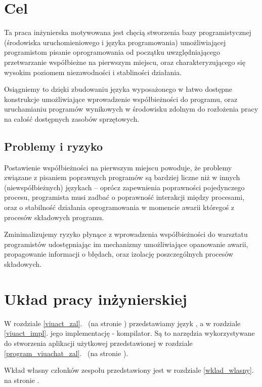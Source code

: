 \section{Cel}

Ta praca inżynierska motywowana jest chęcią stworzenia bazy programistycznej
(środowiska uruchomieniowego i języka programowania) umożliwiającej programistom
pisanie oprogramowania od początku uwzględniającego przetwarzanie współbieżne na
pierwszym miejscu, oraz charakteryzującego się wysokim poziomem niezawodności i
stabliności działania.

Osiągniemy to dzięki zbudowaniu języka wyposażonego w łatwo dostępne konstrukcje
umożliwiające wprowadzenie współbieżności do programu, oraz uruchamianiu
programów wynikowych w środowisku zdolnym do rozłożenia pracy na całość
dostępnych zasobów sprzętowych.

\subsection{Problemy i ryzyko}

Postawienie współbieżności na pierwszym miejscu powoduje, że problemy związane z pisaniem poprawnych programów
są bardziej liczne niż w innych (niewspółbieżnych) językach -- oprócz zapewnienia poprawności pojedynczego
procesu, programista musi zadbać o poprawność interakcji między procesami, oraz o stabilność działania
oprogramowania w momencie awarii któregoś z procesów składowych programu.

Zminimalizujemy ryzyko płynące z wprowadzenia współbieżności do warsztatu programistów udostępniając im
mechanizmy umożliwiające opanowanie awarii, propagowanie informacji o błędach, oraz izolację poszczególnych
procesów składowych.

\section{Układ pracy inżynierskiej}

W rozdziale \ref{viuact_zal}.~ (na stronie \pageref{viuact_zal}) przedstawiamy język
\ViuAct, a w rozdziale \ref{viuact_impl}. jego implementację - kompilator. Są to narzędzia wykorzystywane do
stworzenia aplikacji użytkowej przedstawionej w rozdziale
\ref{program_viuachat_zal}.~ (na stronie \pageref{program_viuachat_zal}).

Wkład własny członków zespołu przedstawiony jest w rozdziale \ref{wklad_wlasny}. na stronie
\pageref{wklad_wlasny}.

